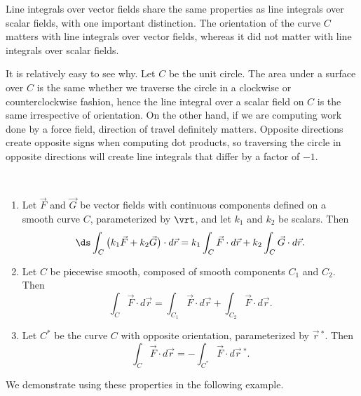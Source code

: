 Line integrals over vector fields share the same properties as line integrals over scalar fields, with one important distinction. The orientation of the curve $C$ matters with line integrals over vector fields, whereas it did not matter with line integrals over scalar fields.

It is relatively easy to see why. Let $C$ be the unit circle. The area under a surface over $C$ is the same whether we traverse the circle in a clockwise or counterclockwise fashion, hence the line integral over a scalar field on $C$ is the same irrespective of orientation. On the other hand, if we are computing work done by a force field, direction of travel definitely matters. Opposite directions create opposite signs when computing dot products, so traversing the circle in opposite directions will create line integrals that differ by a factor of $-1$. 

{\mbox{}\\[-2\baselineskip]
\begin{enumerate}
	\item	Let $\vec F$ and $\vec G$ be  vector fields with continuous components defined on a smooth curve $C$, parameterized by $\vrt$, and let $k_1$ and $k_2$ be scalars. Then
	\[
	\ds \int_C\big(k_1\vec F+k_2\vec G\big)\cdot d\vec r
	= k_1\int_C\vec F\cdot d\vec r +k_2\int_C\vec G\cdot d\vec r.
	\]
	\item Let $C$ be piecewise smooth, composed of smooth components $C_1$ and $C_2$. Then
	\[
	\int_C\vec F\cdot d\vec r
	= \int_{C_1}\vec F\cdot d\vec r + \int_{C_2}\vec F\cdot d\vec r.
	\]
	\item	Let $C^*$ be the curve $C$ with opposite orientation, parameterized by $\vec r\,^*$. Then
	\[\int_C\vec F\cdot d\vec r = -\int_{C^*}\vec F\cdot d\vec r\,^*.\]
	\end{enumerate}}

We demonstrate using these properties in the following example.

